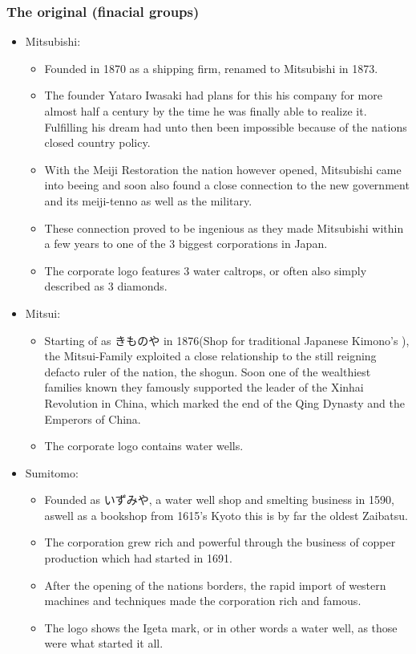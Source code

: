 \documentclass{article}
\newcommand\tabi[1][0.05cm]{\hspace*{#1}}
\begin{document}
\subsubsection{The original  \tabi (finacial groups) }
\begin{itemize}
\item Mitsubishi:
\begin{itemize}
\item Founded in 1870 as a shipping firm, renamed to Mitsubishi in 1873.
\item The founder Yataro Iwasaki had plans for this his company for more almost half a century by the time he was finally able to realize it. Fulfilling his dream had unto then been impossible because of the nations closed country policy. 
\item With the Meiji Restoration the nation however opened, Mitsubishi came into beeing and soon also found a close connection to the new government and its meiji-tenno as well as the military.
\item These connection proved to be ingenious as they made Mitsubishi within a few years to one of the 3 biggest corporations in Japan. 
\item The corporate logo features 3 water caltrops, or often also simply described as 3 diamonds. 
\end{itemize}
\item Mitsui:
\begin{itemize}
\item Starting of as きものや in 1876(Shop for traditional Japanese Kimono's ), the Mitsui-Family exploited a close relationship to the still reigning defacto ruler of the nation, the shogun. Soon one of the wealthiest families known they famously supported the leader of the Xinhai Revolution in China, which marked the end of the Qing Dynasty and the Emperors of China.
\item The corporate logo contains water wells.
\end{itemize}
\item Sumitomo:
\begin{itemize}
\item Founded as いずみや, a water well shop and smelting business in 1590, aswell as a bookshop from 1615's Kyoto this is by far the oldest Zaibatsu.
\item The corporation grew rich and powerful through the business of copper production which had started in 1691.
\item After the opening of the nations borders, the rapid import of western machines and techniques made the corporation rich and famous.
\item The logo shows the Igeta mark, or in other words a water well, as those were what started it all. 
\end{itemize}
\end{itemize}
\end{document}
